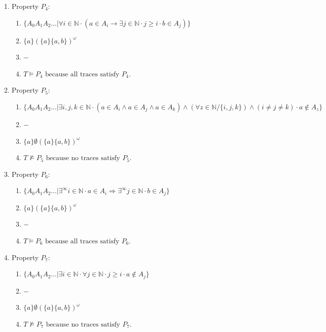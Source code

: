 \documentclass{article}
\newcommand{\N}{\mathbb{N}}
\begin{document}
\begin{enumerate}
    \item Property $P_4:$
    \begin{enumerate}[i]
        \item 
        $
            \{ A_0 A_1 A_2 ... | \forall i \in \N \cdot (a \in A_i \longrightarrow \exists j \in \N \cdot j \geq i \cdot b\in A_j) \}
        $
        \item 
        $
            \{a\} (\{a\}\{a,b\})^\omega
        $
        \item 
        $
            -
        $
        \item 
        $
            T \vDash P_4 \text{ because all traces satisfy $P_4$}.
        $
    \end{enumerate}

    \item Property $P_5:$
    \begin{enumerate}[i]
        \item 
        $
            \{ A_0 A_1 A_2 ... |\exists i,j,k \in \N \cdot (a\in A_i \wedge a\in A_j \wedge a\in A_k) \wedge (\forall z \in \N / \{i,j,k\}) \wedge (i \neq j \neq k) \cdot a\notin A_z \}
        $
        \item 
        $
            -
        $
        \item 
        $
            \{a\} \emptyset (\{a\}\{a,b\})^\omega
        $
        \item 
        $
            T \nvDash P_5 \text{ because no traces satisfy $P_5$}.
        $
    \end{enumerate}

    \item Property $P_6:$
    \begin{enumerate}[i]
        \item 
        $
            \{ A_0 A_1 A_2 ... |{\exists}^\infty i\in \N \cdot a\in A_i \Longrightarrow {\exists}^\infty j\in \N \cdot b\in A_j \}
        $
        \item 
        $
            \{a\} (\{a\}\{a,b\})^\omega
        $
        \item 
        $
            -
        $
        \item 
        $
            T \vDash P_6 \text{ because all traces satisfy $P_6$}.
        $
    \end{enumerate}

    \item Property $P_7:$
    \begin{enumerate}[i]
        \item 
        $
            \{ A_0 A_1 A_2 ... |\exists i \in \N \cdot \forall j\in \N \cdot j\geq i \cdot a\notin A_j \}
        $
        \item 
        $
            -
        $
        \item 
        $
            \{a\} \emptyset (\{a\}\{a,b\})^\omega
        $
        \item 
        $
            T \nvDash P_7 \text{ because no traces satisfy $P_7$}.
        $
    \end{enumerate}
\end{enumerate}
\end{document}
